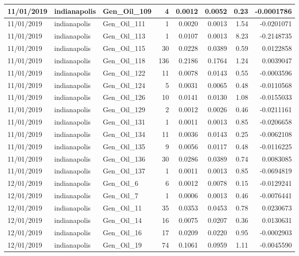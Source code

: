 \documentclass[
  letterpaper,
  DIV=11,
  numbers=noendperiod]{scrartcl}
\begin{document}
\begin{tabular}{l|l|l|r|r|r|r|r}
\hline
11/01/2019 & indianapolis & Gen\_Oil\_109 & 4 & 0.0012 & 0.0052 & 0.23 & -0.0001786\\
\hline
11/01/2019 & indianapolis & Gen\_Oil\_111 & 1 & 0.0020 & 0.0013 & 1.54 & -0.0201071\\
\hline
11/01/2019 & indianapolis & Gen\_Oil\_113 & 1 & 0.0107 & 0.0013 & 8.23 & -0.2148735\\
\hline
11/01/2019 & indianapolis & Gen\_Oil\_115 & 30 & 0.0228 & 0.0389 & 0.59 & 0.0122858\\
\hline
11/01/2019 & indianapolis & Gen\_Oil\_118 & 136 & 0.2186 & 0.1764 & 1.24 & 0.0039047\\
\hline
11/01/2019 & indianapolis & Gen\_Oil\_122 & 11 & 0.0078 & 0.0143 & 0.55 & -0.0003596\\
\hline
11/01/2019 & indianapolis & Gen\_Oil\_124 & 5 & 0.0031 & 0.0065 & 0.48 & -0.0110568\\
\hline
11/01/2019 & indianapolis & Gen\_Oil\_126 & 10 & 0.0141 & 0.0130 & 1.08 & -0.0155033\\
\hline
11/01/2019 & indianapolis & Gen\_Oil\_129 & 2 & 0.0012 & 0.0026 & 0.46 & -0.0211161\\
\hline
11/01/2019 & indianapolis & Gen\_Oil\_131 & 1 & 0.0011 & 0.0013 & 0.85 & -0.0206658\\
\hline
11/01/2019 & indianapolis & Gen\_Oil\_134 & 11 & 0.0036 & 0.0143 & 0.25 & -0.0062108\\
\hline
11/01/2019 & indianapolis & Gen\_Oil\_135 & 9 & 0.0056 & 0.0117 & 0.48 & -0.0116225\\
\hline
11/01/2019 & indianapolis & Gen\_Oil\_136 & 30 & 0.0286 & 0.0389 & 0.74 & 0.0083085\\
\hline
11/01/2019 & indianapolis & Gen\_Oil\_137 & 1 & 0.0011 & 0.0013 & 0.85 & -0.0694819\\
\hline
12/01/2019 & indianapolis & Gen\_Oil\_6 & 6 & 0.0012 & 0.0078 & 0.15 & -0.0129241\\
\hline
12/01/2019 & indianapolis & Gen\_Oil\_7 & 1 & 0.0006 & 0.0013 & 0.46 & -0.0076441\\
\hline
12/01/2019 & indianapolis & Gen\_Oil\_11 & 35 & 0.0353 & 0.0453 & 0.78 & 0.0230673\\
\hline
12/01/2019 & indianapolis & Gen\_Oil\_14 & 16 & 0.0075 & 0.0207 & 0.36 & 0.0130631\\
\hline
12/01/2019 & indianapolis & Gen\_Oil\_16 & 17 & 0.0209 & 0.0220 & 0.95 & -0.0002903\\
\hline
12/01/2019 & indianapolis & Gen\_Oil\_19 & 74 & 0.1061 & 0.0959 & 1.11 & -0.0045590\\

\end{tabular}
\end{document}
